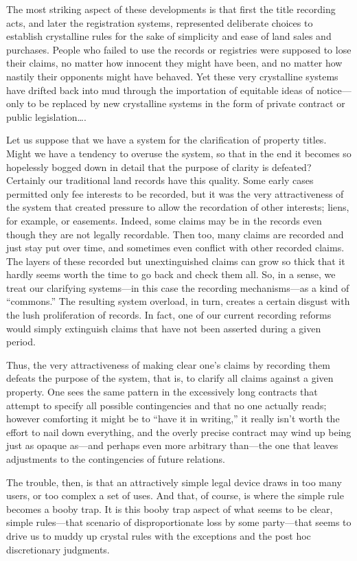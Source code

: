 The most striking aspect of these developments is that first the title recording
acts, and later the registration systems, represented deliberate choices to
establish crystalline rules for the sake of simplicity and ease of land sales
and purchases. People who failed to use the records or registries were supposed
to lose their claims, no matter how innocent they might have been, and no
matter how nastily their opponents might have behaved. Yet these very
crystalline systems have drifted back into mud through the importation of
equitable ideas of notice---only to be replaced by new crystalline systems in
the form of private contract or public legislation\ldots.

Let us suppose that we have a system for the clarification of property titles.
Might we have a tendency to overuse the system, so that in the end it becomes
so hopelessly bogged down in detail that the purpose of clarity is defeated?
Certainly our traditional land records have this quality. Some early cases
permitted only fee interests to be recorded, but it was the very attractiveness
of the system that created pressure to allow the recordation of other
interests; liens, for example, or easements. Indeed, some claims may be in the
records even though they are not legally recordable. Then too, many claims are
recorded and just stay put over time, and sometimes even conflict with other
recorded claims. The layers of these recorded but unextinguished claims can
grow so thick that it hardly seems worth the time to go back and check them
all. So, in a sense, we treat our clarifying systems---in this case the
recording mechanisms---as a kind of ``commons.'' The resulting system overload,
in turn, creates a certain disgust with the lush proliferation of records. In
fact, one of our current recording reforms would simply extinguish claims that
have not been asserted during a given period. 

Thus, the very attractiveness of making clear one's claims by recording them
defeats the purpose of the system, that is, to clarify all claims against a
given property. One sees the same pattern in the excessively long
contracts that attempt to specify all possible contingencies and that no one
actually reads; however comforting it might be to ``have it in writing,'' it
really isn't worth the effort to nail down everything, and the overly precise
contract may wind up being just as opaque as---and perhaps even more arbitrary
than---the one that leaves adjustments to the contingencies of future
relations. 

The trouble, then, is that an attractively simple legal device draws in too many
users, or too complex a set of uses. And that, of course, is where the simple
rule becomes a booby trap. It is this booby trap aspect of what seems to be
clear, simple rules---that scenario of disproportionate loss by some
party---that seems to drive us to muddy up crystal rules with the exceptions and
the post hoc discretionary judgments.

